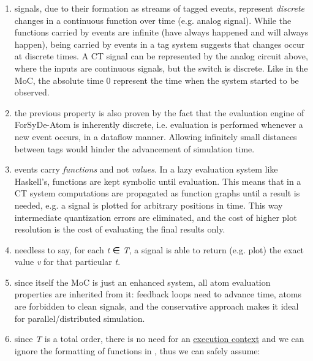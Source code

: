                  \begin{enumerate}
                 \item 
                  signals, due to their formation as streams of tagged
 events, represent \emph{discrete} changes in a continuous function
 over time (e.g. analog signal). While the functions carried by
 events are infinite (have always happened and will always
 happen), being carried by events in a tag system suggests that
 changes occur at discrete times. A CT signal can be represented
 by the analog circuit above, where the inputs are continuous
 signals, but the switch is discrete. Like in the
  MoC, the absolute time 0 represent the time
 when the system started to be observed.\par
                 
                 \item 
                 the previous property is also proven by the fact that the
 evaluation engine of ForSyDe-Atom is inherently discrete,
 i.e. evaluation is performed whenever a new event occurs, in a
 dataflow manner. Allowing infinitely small distances between tags
 would hinder the advancement of simulation time.\par
                 
                 \item 
                 events carry \emph{functions} and not \emph{values}. In a lazy
 evaluation system like Haskell's, functions are kept symbolic
 until evaluation. This means that in a CT system computations are
 propagated as function graphs until a result is needed, e.g. a
 signal is plotted for arbitrary positions in time. This way
 intermediate quantization errors are eliminated, and the cost of
 higher plot resolution is the cost of evaluating the final
 results only.\par
                 
                 \item 
                 needless to say, for each \emph{t} ∈ \emph{T}, a signal is able to
 return (e.g. plot) the exact value \emph{v} for that particular \emph{t}.\par
                 
                 \item 
                 since itself the  MoC is just an enhanced
  system, all atom evaluation properties are
 inherited from it: feedback loops need to advance time, atoms are
 forbidden to clean signals, and the conservative approach makes
 it ideal for parallel/distributed simulation.\par
                 
                 \item 
                 since \emph{T} is a total order, there is no need for an
 \href{ForSyDe-Atom-MoC.html#context}{execution context} and we can
 ignore the formatting of functions in , thus we
 can safely assume:\par
                 
                 \end{enumerate}
